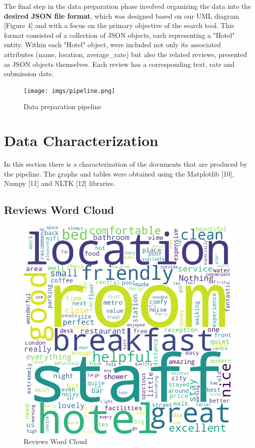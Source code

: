 \documentclass[sigconf]{acmart}
\begin{document}
The final step in the data preparation phase involved organizing the data into the \textbf{desired JSON file format}, which was designed based on our UML diagram [Figure 4] and with a focus on the primary objective of the search tool. This format consisted of a collection of JSON objects, each representing a "Hotel" entity. Within each "Hotel" object, were included not only its associated attributes (name, location, average\_rate) but also the related reviews, presented as JSON objects themselves. Each review has a corresponding text, rate and submission date.

\begin{figure}[h]
  \centering
  \texttt{[image: imgs/pipeline.png]}
  \caption{Data preparation pipeline}
\end{figure}

\section{Data Characterization}

In this section there is a characterization of the documents that are produced by the pipeline. The graphs and tables were obtained using the Matplotlib [10], Numpy [11] and NLTK [12] libraries.

\subsection{Reviews Word Cloud}

\begin{figure}[h]
  \centering
  \includegraphics[width=\linewidth]{imgs/reviews_wordcloud.png}
  \caption{Reviews Word Cloud}
\end{figure}
\end{document}
